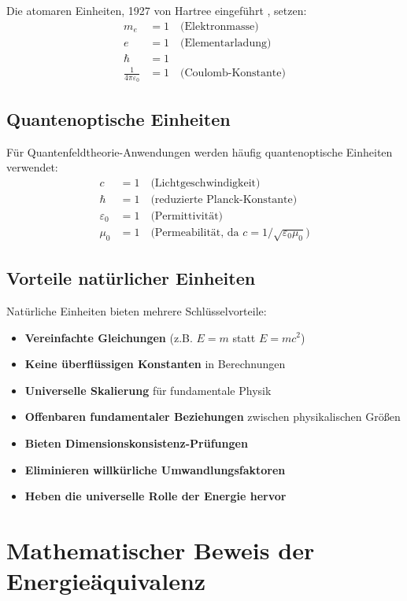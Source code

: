 \documentclass[11pt,a4paper]{article}
\begin{document}
	Die atomaren Einheiten, 1927 von Hartree eingeführt \cite{hartree1957}, setzen:
	\begin{align}
		m_e &= 1 \quad \text{(Elektronmasse)} \\
		e &= 1 \quad \text{(Elementarladung)} \\
		\hbar &= 1 \\
		\frac{1}{4\pi\varepsilon_0} &= 1 \quad \text{(Coulomb-Konstante)}
	\end{align}
	
	\subsection{Quantenoptische Einheiten}
	
	Für Quantenfeldtheorie-Anwendungen werden häufig quantenoptische Einheiten verwendet:
	\begin{align}
		c &= 1 \quad \text{(Lichtgeschwindigkeit)} \\
		\hbar &= 1 \quad \text{(reduzierte Planck-Konstante)} \\
		\varepsilon_0 &= 1 \quad \text{(Permittivität)} \\
		\mu_0 &= 1 \quad \text{(Permeabilität, da } c = 1/\sqrt{\varepsilon_0 \mu_0}\text{)}
	\end{align}
	
	\subsection{Vorteile natürlicher Einheiten}
	
	Natürliche Einheiten bieten mehrere Schlüsselvorteile:
	\begin{itemize}
		\item \textbf{Vereinfachte Gleichungen} (z.B. $E = m$ statt $E = mc^2$)
		\item \textbf{Keine überflüssigen Konstanten} in Berechnungen
		\item \textbf{Universelle Skalierung} für fundamentale Physik
		\item \textbf{Offenbaren fundamentaler Beziehungen} zwischen physikalischen Größen
		\item \textbf{Bieten Dimensionskonsistenz-Prüfungen}
		\item \textbf{Eliminieren willkürliche Umwandlungsfaktoren}
		\item \textbf{Heben die universelle Rolle der Energie hervor}
	\end{itemize}
	
	\section{Mathematischer Beweis der Energieäquivalenz}
	
\end{document}
